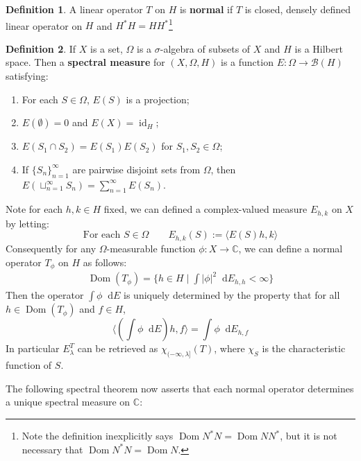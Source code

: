 \documentclass[11pt]{report}
\theoremstyle{definition}
\newtheorem{Def}{Definition}[chapter]
\theoremstyle{plain}
\DeclareMathOperator{\id}{id}
\DeclareMathOperator{\dom}{Dom}
\newcommand{\complex}{\mathbb{C}}
\newcommand{\bdd}{\mathcal{B}}
\newcommand{\brac}[1]{\langle #1 \rangle}
\newcommand{\mass}[1]{\mathop{}\mathrm{d}{#1}}
\begin{document}
\begin{Def}
	A linear operator $T$ on $H$ is \textbf{normal} if $T$ is closed, densely defined linear operator on $H$ and $H^*H=HH^*$\footnote{Note the definition inexplicitly says $\dom N^*N=\dom NN^*$, but it is not necessary that $\dom N^*N=\dom N$.}
\end{Def}
\begin{Def}\label{spectral measure}
	If $X$ is a set, $\Omega$ is a $\sigma$-algebra of subsets of $X$ and $H$ is a Hilbert space. Then a \textbf{spectral measure} for $(X, \Omega, H)$ is a function $E:\Omega\to \bdd(H)$ satisfying:
	\begin{enumerate}
		\item For each $S\in \Omega$, $E(S)$ is a projection;
		\item $E(\emptyset)=0$ and $E(X)=\id_H$;
		\item $E(S_1\cap S_2)=E(S_1)E(S_2)$ for $S_1, S_2\in \Omega$;
		\item If $\{S_n\}_{n=1}^\infty$ are pairwise disjoint sets from $\Omega$, then $E(\sqcup_{n=1}^\infty S_n)=\sum_{n=1}^{\infty}E(S_n)$.
	\end{enumerate}
\end{Def}
Note for each $h,k\in H$ fixed, we can defined a complex-valued measure $E_{h,k}$ on $X$ by letting:
\begin{equation}
\text{For each $S\in \Omega$} \qquad E_{h,k}(S):=\brac{E(S)h,k}
\end{equation} 
Consequently for any $\Omega$-measurable function $\phi:X\to \complex$, we can define a normal operator $T_\phi$ on $H$ as follows:
\begin{align*}
\dom(T_\phi)=\{h\in H\mid \int|\phi|^2\mass{E_{h,h}}<\infty\}
\end{align*}
Then the operator $\int\phi \mass{E}$ is uniquely determined by the property that for all $h\in \dom(T_\phi)$ and $f\in H$,
\begin{equation}\label{1.65}
\brac{(\int\phi \mass{E})h, f}=\int\phi \mass{E_{h,f}}
\end{equation}
In particular $E^T_\lambda$ can be retrieved as $\chi_{(-\infty, \lambda]}(T)$, where $\chi_S$ is the characteristic function of $S$.
\par The following spectral theorem now asserts that each normal operator determines a unique spectral measure on $\complex$:
\end{document}
